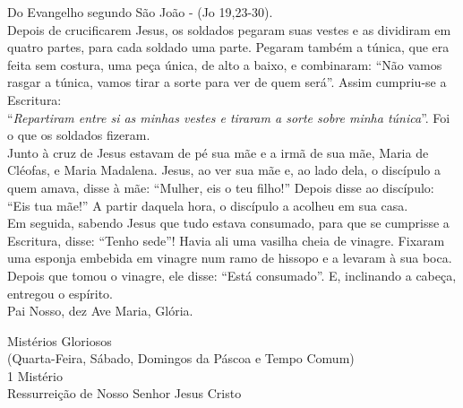 \begin{flushleft}
    Do Evangelho segundo São João - (\textcolor{VioletRed2}{Jo 19,23-30}). \\
    \hfill{} \break{}
    Depois de crucificarem Jesus, os soldados pegaram suas vestes e as dividiram em quatro partes, para cada soldado uma parte. Pegaram também a túnica, que era feita sem costura, uma peça única, de alto a baixo, e combinaram: ``Não vamos rasgar a túnica, vamos tirar a sorte para ver de quem será''. Assim cumpriu-se a Escritura:
    \vspace{.2cm} \\
    ``\textit{Repartiram entre si as minhas vestes e tiraram a sorte sobre minha túnica}''. Foi o que os soldados fizeram.
    \vspace{.2cm} \\
    Junto à cruz de Jesus estavam de pé sua mãe e a irmã de sua mãe, Maria de Cléofas, e Maria Madalena. Jesus, ao ver sua mãe e, ao lado dela, o discípulo a quem amava, disse à mãe: ``Mulher, eis o teu filho!'' Depois disse ao discípulo: ``Eis tua mãe!'' A partir daquela hora, o discípulo a acolheu em sua casa.
    \vspace{.2cm} \\
    Em seguida, sabendo Jesus que tudo estava consumado, para que se cumprisse a Escritura, disse: ``Tenho sede''! Havia ali uma vasilha cheia de vinagre. Fixaram uma esponja embebida em vinagre num ramo de hissopo e a levaram à sua boca. Depois que tomou o vinagre, ele disse: ``Está consumado''. E, inclinando a cabeça, entregou o espírito. \\
    \hfill{} \break{}
    Pai Nosso, dez Ave Maria, Glória.
\end{flushleft}
\newpage
\begin{center}
    Mistérios Gloriosos \\ \textcolor{VioletRed2}{\scriptsize{(Quarta-Feira, Sábado, Domingos da Páscoa e Tempo Comum)}} \\
    \hfill{} \break{}
    1\textordmasculine{} Mistério \\ Ressurreição de Nosso Senhor Jesus Cristo
\end{center}
